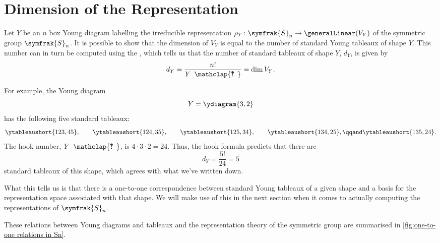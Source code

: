 \documentclass[fleqn]{NotesClass}
\newcommand{\symmetricGroup}[1][n]{\symfrak{S}_{#1}}
\newcommand{\hooknumber}[1]{#1{\phantom{?}\mkern1mu\mathclap{\ooalign{\hfil ? \hfil \cr \hfil ! \hfil}}}}
\begin{document}
    \section{Dimension of the Representation}
    Let \(Y\) be an \(n\) box Young diagram labelling the irreducible representation \(\rho_Y\colon \symmetricGroup \to \generalLinear(V_Y)\) of the symmetric group \(\symmetricGroup\).
    It is possible to show that the dimension of \(V_Y\) is equal to the number of standard Young tableaux of shape \(Y\).
    This number can in turn be computed using the  \cite[88]{cvitanovic}, which tells us that the number of standard tableaux of shape \(Y\), \(d_Y\), is given by
    \begin{equation}
        d_Y = \frac{n!}{\hooknumber{Y}} = \dim V_Y.
    \end{equation}
    
    For example, the Young diagram
    \begin{equation}
        Y = \ydiagram{3,2}
    \end{equation}
    has the following five standard tableaux:
    \begin{equation}
        \ytableaushort{123,45}, \qquad \ytableaushort{124,35}, \qquad \ytableaushort{125,34}, \qquad \ytableaushort{134,25}, \qqand \ytableaushort{135,24}.
    \end{equation}
    The hook number, \(\hooknumber{Y}\), is \(4 \cdot 3 \cdot 2 = 24\).
    Thus, the hook formula predicts that there are
    \begin{equation}
        d_Y = \frac{5!}{24} = 5
    \end{equation}
    standard tableaux of this shape, which agrees with what we've written down.
    
    What this tells us is that there is a one-to-one correspondence between standard Young tableaux of a given shape and a basis for the representation space associated with that shape.
    We will make use of this in the next section when it comes to actually computing the representations of \(\symmetricGroup\).
    
    These relations between Young diagrams and tableaux and the representation theory of the symmetric group are summarised in \cref{fig:one-to-one relations in Sn}.
    
\end{document}

